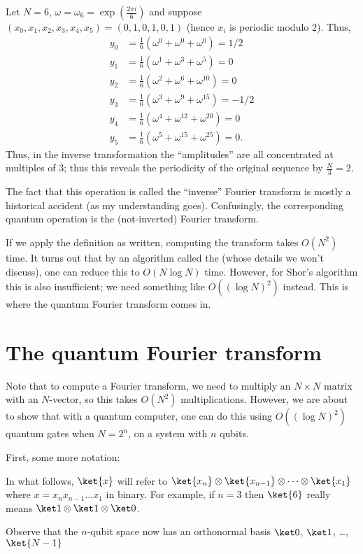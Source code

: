 \begin{example}
	Let $N = 6$, $\omega = \omega_6 = \exp(\frac{2\pi i}{6})$
	and suppose $(x_0,x_1,x_2,x_3,x_4,x_5)=(0,1,0,1,0,1)$
	(hence $x_i$ is periodic modulo $2$).
	Thus,
	\begin{align*}
		y_0 &= \tfrac16\left(\omega^0 + \omega^0+ \omega^0\right) = 1/2 \\
		y_1 &= \tfrac16\left(\omega^1 + \omega^3 + \omega^5\right) = 0 \\
		y_2 &= \tfrac16\left( \omega^2 + \omega^{6} + \omega^{10} \right) = 0 \\
		y_3 &= \tfrac16\left( \omega^3 + \omega^9 + \omega^{15} \right) = -1/2 \\
		y_4 &= \tfrac16\left( \omega^4 + \omega^{12} + \omega^{20} \right) = 0 \\
		y_5 &= \tfrac16\left( \omega^5 + \omega^{15} + \omega^{25} \right) = 0.
	\end{align*}
	Thus, in the inverse transformation the ``amplitudes''
	are all concentrated at multiples of $3$;
	thus this reveals the periodicity of the original
	sequence by $\frac N3 = 2$.
\end{example}
\begin{remark}
	The fact that this operation is called the ``inverse''
	Fourier transform is mostly a historical accident
	(as my understanding goes).
	Confusingly, the corresponding quantum operation is the
	(not-inverted) Fourier transform.
\end{remark}
If we apply the definition as written, computing the transform takes $O(N^2)$ time.
It turns out that by an algorithm called the 
(whose details we won't discuss), one can reduce this to $O(N \log N)$ time.
However, for Shor's algorithm this is also insufficient;
we need something like $O\left( (\log N)^2 \right)$ instead.
This is where the quantum Fourier transform comes in.

\section{The quantum Fourier transform}
Note that to compute a Fourier transform, we need to multiply an $N \times N$ matrix
with an $N$-vector, so this takes $O(N^2)$ multiplications.
However, we are about to show that with a quantum computer,
one can do this using $O( (\log N)^2 )$ quantum gates when $N = 2^n$,
on a system with $n$ qubits.

First, some more notation:
\begin{abuse}
	In what follows, $\ket{x}$ will refer to
	$\ket{x_n} \otimes \ket{x_{n-1}} \otimes \dots \otimes \ket{x_1}$
	where $x = x_n x_{n-1} \dots x_1$ in binary.
	For example, if $n = 3$
	then $\ket{6}$ really means $\ket1 \otimes \ket1 \otimes \ket 0$.
\end{abuse}
Observe that the $n$-qubit space now has an
orthonormal basis $\ket0$, $\ket1$, \dots, $\ket{N-1}$


